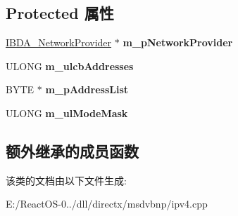 \subsection*{Protected 属性}
\begin{DoxyCompactItemize}
\item 
\mbox{\label{class_c_i_p_v4_filter_a5359b0914bf19c01f9186a2c878a291f}} 
\hyperlink{interface_i_b_d_a___network_provider}{I\+B\+D\+A\+\_\+\+Network\+Provider} $\ast$ {\bfseries m\+\_\+p\+Network\+Provider}
\item 
\mbox{\label{class_c_i_p_v4_filter_a7091e9960fb649026c3602694a876508}} 
U\+L\+O\+NG {\bfseries m\+\_\+ulcb\+Addresses}
\item 
\mbox{\label{class_c_i_p_v4_filter_ab623c75a3162abd76657ba32df8f8beb}} 
B\+Y\+TE $\ast$ {\bfseries m\+\_\+p\+Address\+List}
\item 
\mbox{\label{class_c_i_p_v4_filter_a1e6adf0b1441cde505f71f89ca633ef5}} 
U\+L\+O\+NG {\bfseries m\+\_\+ul\+Mode\+Mask}
\end{DoxyCompactItemize}
\subsection*{额外继承的成员函数}


该类的文档由以下文件生成\+:\begin{DoxyCompactItemize}
\item 
E\+:/\+React\+O\+S-\/0../dll/directx/msdvbnp/ipv4.\+cpp\end{DoxyCompactItemize}
